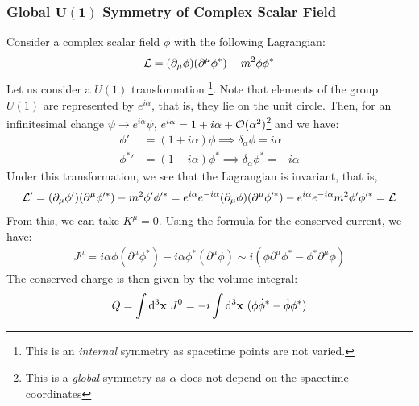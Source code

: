 \subsubsection{Global $\mathbf{U(1)}$ Symmetry of Complex Scalar Field}\label{sec:intsym}
Consider a complex scalar field $\phi$ with the following Lagrangian:
$$\mathcal L = (\partial_\mu \phi)(\partial^\mu \phi^*) - m^2\phi\phi^*$$
Let us consider a $U(1)$ transformation \footnote{This is an \textit{internal} symmetry as spacetime points are not varied.}. Note that elements of the group $U(1)$ are represented by $e^{i\alpha}$, that is, they lie on the unit circle. Then, for an infinitesimal change $\psi\rightarrow e^{i\alpha}\psi$, $e^{i\alpha}=1 + i\alpha +\mathcal O(\alpha^2)$\footnote{This is a \textit{global} symmetry as $\alpha$ does not depend on the spacetime coordinates} and we have:
\begin{align*}
    \phi' &= (1+i\alpha)\phi \implies \delta_\alpha\phi = i\alpha\\
    {\phi^*}' &= (1-i\alpha)\phi^* \implies \delta_\alpha\phi^* = -i\alpha
\end{align*}
Under this transformation, we see that the Lagrangian is invariant, that is,
$$\mathcal L' = (\partial_\mu \phi')(\partial^\mu \phi'^*) - m^2\phi'\phi'^* = e^{i\alpha}e^{-i\alpha} (\partial_\mu \phi)(\partial^\mu \phi'^*) - e^{i\alpha}e^{-i\alpha}m^2\phi'\phi'^*= \mathcal L$$
From this, we can take $K^\mu = 0$. Using the formula for the conserved current, we have:
\begin{align}\label{eqn:csfcurr}
    J^\mu = i\alpha\phi(\partial^\mu \phi^*) -i\alpha\phi^* (\partial^\mu \phi) \sim i(\phi\partial^\mu \phi^* -\phi^*\partial^\mu \phi )
\end{align}
The conserved charge is then given by the volume integral:
$$Q = \int \dd^3\vb{x}\ J^0 = -i\int \dd^3\vb{x}\ (\phi\dot{\phi}^* - \dot{\phi}\phi^*)$$
